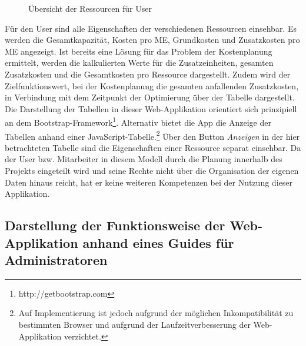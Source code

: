 \documentclass[a4paper,12pt,parskip,bibtotoc,liststotoc]{article}
\begin{document}
\begin{figure}[h!]
  \begin{center}
    \caption{Übersicht der Ressourcen für User}  \label{ResUs}
  \end{center}
\end{figure}

Für den User sind alle Eigenschaften der verschiedenen Ressourcen einsehbar. Es werden die Gesamtkapazität, Kosten pro ME, Grundkosten und Zusatzkosten pro ME angezeigt. Ist bereits eine Lösung für das Problem der Kostenplanung ermittelt, werden die kalkulierten Werte für die Zusatzeinheiten, gesamten Zusatzkosten und die Gesamtkosten pro Ressource dargestellt. Zudem wird der Zielfunktionswert, bei der Kostenplanung die gesamten anfallenden Zusatzkosten, in Verbindung mit dem Zeitpunkt der Optimierung über der Tabelle dargestellt. Die Darstellung der Tabellen in dieser Web-Applikation orientiert sich prinzipiell an dem Bootstrap-Framework\footnote{http://getbootstrap.com}. Alternativ bietet die App die Anzeige der Tabellen anhand einer JavaScript-Tabelle.\footnote{Auf Implementierung ist jedoch aufgrund der möglichen Inkompatibilität zu bestimmten Browser und aufgrund der Laufzeitverbesserung der Web-Applikation verzichtet.} Über den Button \textit{Anzeigen} in der hier betrachteten Tabelle sind die Eigenschaften einer Ressource separat einsehbar. Da der User bzw. Mitarbeiter in diesem Modell durch die Planung innerhalb des Projekts eingeteilt wird und seine Rechte nicht über die Organisation der eigenen Daten hinaus reicht, hat er keine weiteren Kompetenzen bei der Nutzung dieser Applikation.

\subsection{Darstellung der Funktionsweise der Web-Applikation anhand eines Guides für Administratoren}\label{Admins}
\end{document}
